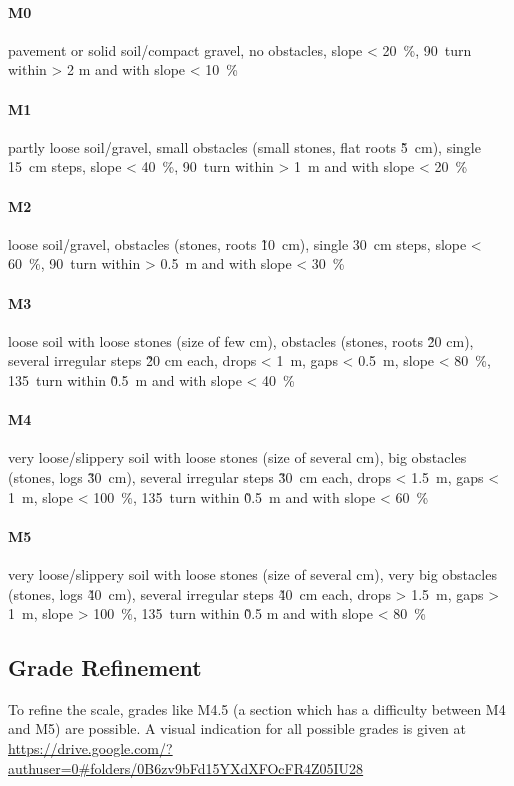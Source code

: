 \documentclass[a4paper,oneside]{scrartcl}
\begin{document}
\paragraph{M0}
pavement or solid soil/compact gravel, no obstacles, slope < 20~\%,
90\textdegree\ turn within > 2 m and with slope < 10~\%

\paragraph{M1}
partly loose soil/gravel,
small obstacles (small stones, flat roots \~ 5~cm),
single 15~cm steps,
slope < 40~\%,
90\textdegree\ turn within > 1~m and with slope < 20~\%

\paragraph{M2}
loose soil/gravel,
obstacles (stones, roots \~ 10~cm),
single 30~cm steps,
slope < 60~\%,
90\textdegree\ turn within > 0.5~m and with slope < 30~\%

\paragraph{M3}
loose soil with loose stones (size of few cm),
obstacles (stones, roots \~ 20 cm),
several irregular steps \~ 20 cm each,
drops < 1~m, gaps < 0.5~m,
slope < 80~\%,
135\textdegree\ turn within \~ 0.5~m and with slope < 40~\%

\paragraph{M4}
very loose/slippery soil with loose stones (size of several cm),
big obstacles (stones, logs \~ 30~cm),
several irregular steps \~ 30~cm each,
drops < 1.5~m, gaps < 1~m,
slope < 100~\%,
135\textdegree\ turn within \~ 0.5~m and with slope < 60~\%

\paragraph{M5}
very loose/slippery soil with loose stones (size of several cm),
very big obstacles (stones, logs \~ 40~cm),
several irregular steps \~ 40~cm each,
drops > 1.5~m, gaps > 1~m,
slope > 100~\%,
135\textdegree\ turn within \~ 0.5 m and with slope < 80~\%

\subsection{Grade Refinement}
To refine the scale, grades like M4.5 (a section which has a difficulty between
M4 and M5) are possible.
A visual indication for all possible grades is given at
\url{https://drive.google.com/?authuser=0#folders/0B6zv9bFd15YXdXFOcFR4Z05IU28}
\end{document}
